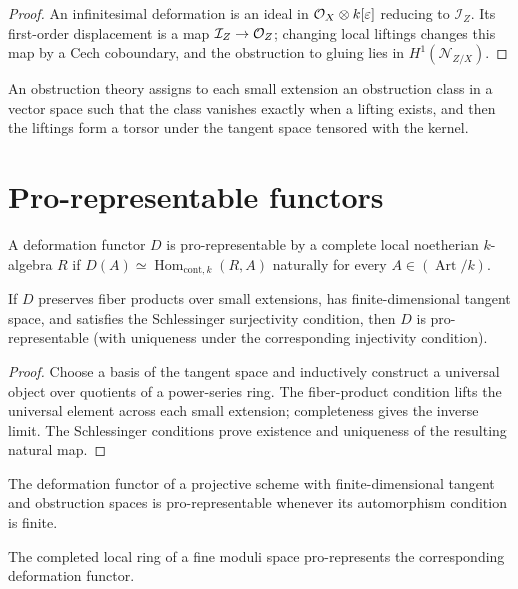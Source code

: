 \begin{proof}
An infinitesimal deformation is an ideal in $\mathcal O_X\otimes k[\varepsilon]$
reducing to $\mathcal I_Z$.  Its first-order displacement is a map
$\mathcal I_Z\to\mathcal O_Z$; changing local liftings changes this map by a Cech
 coboundary, and the obstruction to gluing lies in $H^1(\mathcal N_{Z/X})$.
\end{proof}
\begin{definition}\label{fga-def-6-1-21}
An obstruction theory assigns to each small extension an obstruction class in a
vector space such that the class vanishes exactly when a lifting exists, and
then the liftings form a torsor under the tangent space tensored with the kernel.
\end{definition}

\section{Pro-representable functors}
\begin{definition}\label{fga-def-6-2-1}
A deformation functor $D$ is pro-representable by a complete local noetherian
$k$-algebra $R$ if $D(A)\simeq\operatorname{Hom}_{\mathrm{cont},k}(R,A)$
naturally for every $A\in(\operatorname{Art}/k)$.
\end{definition}
\begin{theorem}\label{fga-thm-6-2-4}
If $D$ preserves fiber products over small extensions, has finite-dimensional
tangent space, and satisfies the Schlessinger surjectivity condition, then $D$
is pro-representable (with uniqueness under the corresponding injectivity
condition).
\end{theorem}
\begin{proof}
Choose a basis of the tangent space and inductively construct a universal object
over quotients of a power-series ring.  The fiber-product condition lifts the
universal element across each small extension; completeness gives the inverse
limit.  The Schlessinger conditions prove existence and uniqueness of the
resulting natural map.
\end{proof}
\begin{corollary}\label{fga-cor-6-2-5}
The deformation functor of a projective scheme with finite-dimensional tangent
and obstruction spaces is pro-representable whenever its automorphism condition
is finite.
\end{corollary}
\begin{corollary}\label{fga-cor-6-2-6}
The completed local ring of a fine moduli space pro-represents the corresponding
deformation functor.
\end{corollary}

